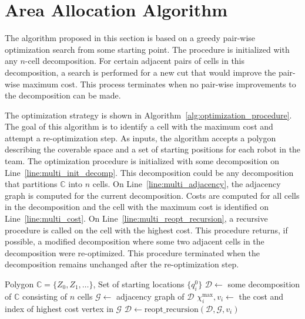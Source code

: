 \documentclass[../main.tex]{subfiles}
\begin{document}
\section{Area Allocation Algorithm}
\label{section:multi_algorithm}

The algorithm proposed in this section is based on a greedy pair-wise optimization search from some starting point. The procedure is initialized with any $n$-cell decomposition. For certain adjacent pairs of cells in this decomposition, a search is performed for a new cut that would improve the pair-wise maximum cost. This process terminates when no pair-wise improvements to the decomposition can be made. %

The optimization strategy is shown in Algorithm~\ref{alg:optimization_procedure}. The goal of this algorithm is to identify a cell with the maximum cost and attempt a re-optimization step. As inputs, the algorithm accepts a polygon describing the coverable space and a set of starting positions for each robot in the team. The optimization procedure is initialized with some decomposition on Line~\ref{line:multi_init_decomp}. This decomposition could be any decomposition that partitions $\mathbb{C}$ into $n$ cells. On Line~\ref{line:multi_adjacency}, the adjacency graph is computed for the current decomposition. Costs are computed for all cells in the decomposition and the cell with the maximum cost is identified on Line~\ref{line:multi_cost}. On Line~\ref{line:multi_reopt_recursion}, a recursive procedure is called on the cell with the highest cost. This procedure returns, if possible, a modified decomposition where some two adjacent cells in the decomposition were re-optimized. This procedure terminated when the decomposition remains unchanged after the re-optimization step.

\begin{algorithm}
	\caption{$\text{optimization\_procedure}(\mathbb{C}, \{q^0_i\})$}
	\label{alg:optimization_procedure}
	\begin{algorithmic}[1]
		\REQUIRE Polygon $\mathbb{C}=\{Z_0,Z_1,\ldots\}$, Set of starting locations $\{q^0_i\}$
			\STATE $\mathcal{D}\gets$ some decomposition of $\mathbb{C}$ consisting of $n$ cells \label{line:multi_init_decomp}
			\REPEAT
			\STATE $\mathcal{G}\gets$ adjacency graph of $\mathcal{D}$ \label{line:multi_adjacency}
			\STATE $\chi^{\max}_i,v_i\gets$ the cost and index of highest cost vertex in $\mathcal{G}$ \label{line:multi_cost}
			\STATE $\mathcal{D}\gets\text{reopt\_recursion}(\mathcal{D},\mathcal{G}, v_i)$ \label{line:multi_reopt_recursion}
	\end{algorithmic}
\end{algorithm}
\end{document}

